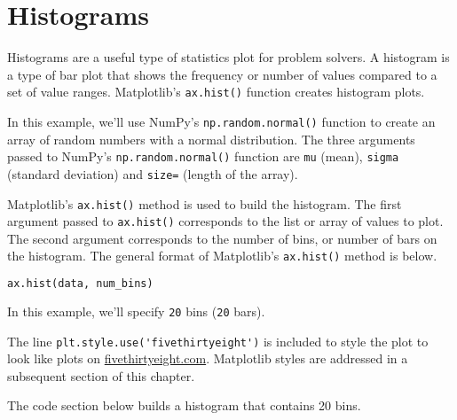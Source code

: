 \documentclass{book}
\newcommand{\passthrough}[1]{#1}
\begin{document}
    
        \hypertarget{histograms}{%
\section{Histograms}\label{histograms}}
    




    
        Histograms are a useful type of statistics plot for problem solvers. A
histogram is a type of bar plot that shows the frequency or number of
values compared to a set of value ranges. Matplotlib's
\passthrough{\lstinline!ax.hist()!} function creates histogram plots.
    




    
        In this example, we'll use NumPy's
\passthrough{\lstinline!np.random.normal()!} function to create an array
of random numbers with a normal distribution. The three arguments passed
to NumPy's \passthrough{\lstinline!np.random.normal()!} function are
\passthrough{\lstinline!mu!} (mean), \passthrough{\lstinline!sigma!}
(standard deviation) and \passthrough{\lstinline!size=!} (length of the
array).

Matplotlib's \passthrough{\lstinline!ax.hist()!} method is used to build
the histogram. The first argument passed to
\passthrough{\lstinline!ax.hist()!} corresponds to the list or array of
values to plot. The second argument corresponds to the number of bins,
or number of bars on the histogram. The general format of Matplotlib's
\passthrough{\lstinline!ax.hist()!} method is below.

\begin{lstlisting}[language=Python]
ax.hist(data, num_bins)
\end{lstlisting}

In this example, we'll specify \passthrough{\lstinline!20!} bins
(\passthrough{\lstinline!20!} bars).

The line \passthrough{\lstinline!plt.style.use('fivethirtyeight')!} is
included to style the plot to look like plots on
\href{https://fivethirtyeight.com}{fivethirtyeight.com}. Matplotlib
styles are addressed in a subsequent section of this chapter.

The code section below builds a histogram that contains 20 bins.
    
\end{document}
